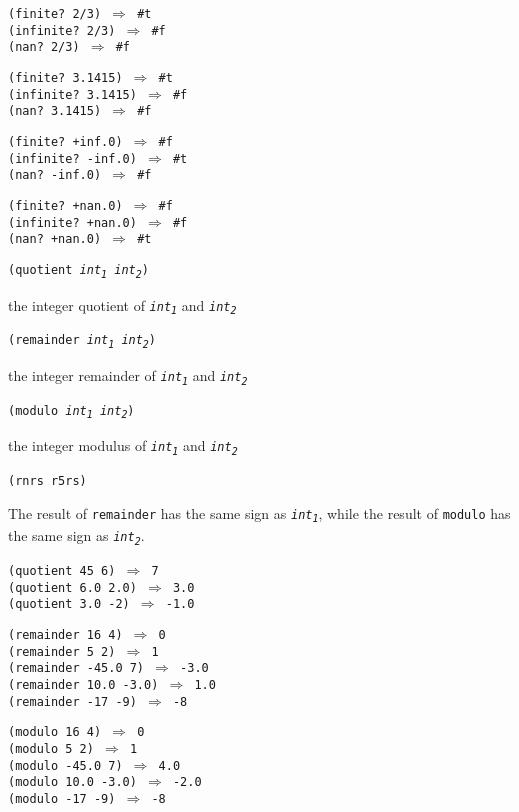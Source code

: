 \begin{alltt}
(finite? 2/3) \(\Rightarrow\) \#{}t
(infinite? 2/3) \(\Rightarrow\) \#{}f
(nan? 2/3) \(\Rightarrow\) \#{}f

(finite? 3.1415) \(\Rightarrow\) \#{}t
(infinite? 3.1415) \(\Rightarrow\) \#{}f
(nan? 3.1415) \(\Rightarrow\) \#{}f

(finite? +inf.0) \(\Rightarrow\) \#{}f
(infinite? -inf.0) \(\Rightarrow\) \#{}t
(nan? -inf.0) \(\Rightarrow\) \#{}f

(finite? +nan.0) \(\Rightarrow\) \#{}f
(infinite? +nan.0) \(\Rightarrow\) \#{}f
(nan? +nan.0) \(\Rightarrow\) \#{}t
\end{alltt}

\begin{description}

\label{objects_s98}\item[procedure] \texttt{(quotient \textit{int\textsubscript{1}} \textit{int\textsubscript{2}})}



\item[returns] the integer quotient of \texttt{\textit{int\textsubscript{1}}} and \texttt{\textit{int\textsubscript{2}}}


\item[procedure] \texttt{(remainder \textit{int\textsubscript{1}} \textit{int\textsubscript{2}})}



\item[returns] the integer remainder of \texttt{\textit{int\textsubscript{1}}} and \texttt{\textit{int\textsubscript{2}}}


\item[procedure] \texttt{(modulo \textit{int\textsubscript{1}} \textit{int\textsubscript{2}})}



\item[returns] the integer modulus of \texttt{\textit{int\textsubscript{1}}} and \texttt{\textit{int\textsubscript{2}}}


\item[libraries] \texttt{(rnrs r5rs)}
\end{description}


The result of \texttt{remainder} has the same sign as \texttt{\textit{int\textsubscript{1}}},
while the result of \texttt{modulo} has the same sign as \texttt{\textit{int\textsubscript{2}}}.


\begin{alltt}
(quotient 45 6) \(\Rightarrow\) 7
(quotient 6.0 2.0) \(\Rightarrow\) 3.0
(quotient 3.0 -2) \(\Rightarrow\) -1.0

(remainder 16 4) \(\Rightarrow\) 0
(remainder 5 2) \(\Rightarrow\) 1
(remainder -45.0 7) \(\Rightarrow\) -3.0
(remainder 10.0 -3.0) \(\Rightarrow\) 1.0
(remainder -17 -9) \(\Rightarrow\) -8

(modulo 16 4) \(\Rightarrow\) 0
(modulo 5 2) \(\Rightarrow\) 1
(modulo -45.0 7) \(\Rightarrow\) 4.0
(modulo 10.0 -3.0) \(\Rightarrow\) -2.0
(modulo -17 -9) \(\Rightarrow\) -8
\end{alltt}

